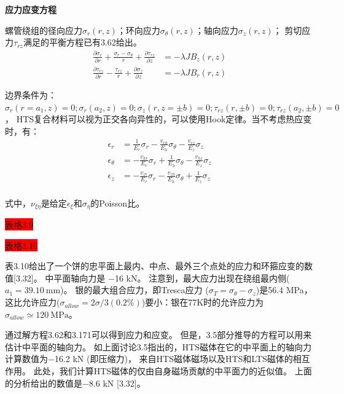 \textbf{应力应变方程}

螺管绕组的径向应力$\sigma_r(r, z)$；环向应力$\sigma_\theta(r, z)$；轴向应力$\sigma_z(r, z)$；
剪切应力$\tau_{rz}$满足的平衡方程已有3.62给出。
\begin{align*}
\frac{\partial\sigma_{r}}{\partial r}+\frac{\sigma_{r}-\sigma_{\theta}}{r}+\frac{\partial\tau_{rz}}{\partial z}&=-\lambda JB_{z}(r,z)\tag{3.62a}\\%
\frac{\partial\tau_{rz}}{\partial r}-\frac{\tau_{rz}}{r}+\frac{\partial\sigma_{z}}{\partial z}&=-\lambda JB_{r}(r,z)\tag{3.62b}%
\end{align*}

边界条件为：$\sigma_r(r = a_1, z) = 0; \sigma_r(a_2, z) = 0; \sigma_z(r, z = \pm b) = 0;
\tau_{rz}(r, \pm b)=0; \tau_{rz}(a_2,\pm b)=0$，
HTS复合材料可以视为正交各向异性的，可以使用Hook定律。当不考虑热应变时，有：
\begin{subequations}
	\begin{align}
\epsilon_{r}&=\frac{1}{E_{r}}\sigma_{r}-\frac{v_{rh}}{E_{h}}\sigma_{\theta}-\frac{v_{rz}}{E_{z}}\sigma_{z}\\%
\epsilon_{\theta}&=-\frac{v_{hr}}{E_{r}}\sigma_{r}+\frac{1}{E_{h}}\sigma_{\theta}-\frac{v_{hz}}{E_{z}}\sigma_{z}\\%
\epsilon_{z}&=-\frac{v_{zr}}{E_{r}}\sigma_{r}-\frac{v_{zh}}{E_{h}}\sigma_{\theta}+\frac{1}{E_{z}}\sigma_{z}\\%
	\end{align}
\end{subequations}

式中，$\nu_{\xi\eta}$是给定$\epsilon_\xi$和$\sigma_\eta$的Poisson比。

\colorbox{red}{表格3.9}

\colorbox{red}{表格3.10}

表3.10给出了一个饼的忠平面上最内、中点、最外三个点处的应力和环箍应变的数值[3.32]。
中平面轴向力是 −16 kN。
注意到，最大应力出现在绕组最内侧($a_1 =39.10\ \mathrm{mm}$)。
银的最大组合应力，即Tresca应力 ($\sigma_T= \sigma_{\theta} −\sigma_z$)是56.4 MPa，
这比允许应力($\sigma_{allow}=2\sigma/3(0.2\%)$)要小：银在77K时的允许应力为$\sigma_{allow}\simeq 120\ \mathrm{MPa}$。

通过解方程3.62和3.171可以得到应力和应变。
但是，3.5部分推导的方程可以用来估计中平面的轴向力。
如上面讨论3.5指出的，HTS磁体在它的中平面上的轴向力计算数值为−16.2 kN (即压缩力)，
来自HTS磁体磁场以及HTS和LTS磁体的相互作用。
此处，我们计算HTS磁体的仅由自身磁场贡献的中平面力的近似值。
上面的分析给出的数值是−8.6 kN [3.32]。

